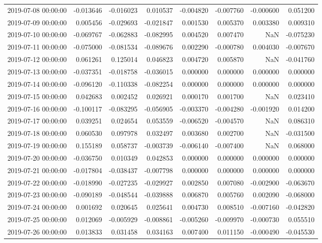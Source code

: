\begin{tabular}{lrrrrrrr}
2019-07-08 00:00:00 & -0.013646 & -0.016023 & 0.010537 & -0.004820 & -0.007760 & -0.000600 & 0.051200 \\
2019-07-09 00:00:00 & 0.005456 & -0.029693 & -0.021847 & 0.001530 & 0.005370 & 0.003380 & 0.009310 \\
2019-07-10 00:00:00 & -0.069767 & -0.062883 & -0.082995 & 0.004520 & 0.007470 & NaN & -0.075230 \\
2019-07-11 00:00:00 & -0.075000 & -0.081534 & -0.089676 & 0.002290 & -0.000780 & 0.004030 & -0.007670 \\
2019-07-12 00:00:00 & 0.061261 & 0.125014 & 0.046823 & 0.004720 & 0.005870 & NaN & -0.041760 \\
2019-07-13 00:00:00 & -0.037351 & -0.018758 & -0.036015 & 0.000000 & 0.000000 & 0.000000 & 0.000000 \\
2019-07-14 00:00:00 & -0.096120 & -0.110338 & -0.082254 & 0.000000 & 0.000000 & 0.000000 & 0.000000 \\
2019-07-15 00:00:00 & 0.042683 & 0.002452 & 0.026921 & 0.000170 & 0.001700 & NaN & 0.023410 \\
2019-07-16 00:00:00 & -0.100117 & -0.083295 & -0.056905 & -0.003370 & -0.004280 & -0.001920 & 0.014200 \\
2019-07-17 00:00:00 & 0.039251 & 0.024654 & 0.053559 & -0.006520 & -0.004570 & NaN & 0.086310 \\
2019-07-18 00:00:00 & 0.060530 & 0.097978 & 0.032497 & 0.003680 & 0.002700 & NaN & -0.031500 \\
2019-07-19 00:00:00 & 0.155189 & 0.058737 & -0.003739 & -0.006140 & -0.007400 & NaN & 0.068000 \\
2019-07-20 00:00:00 & -0.036750 & 0.010349 & 0.042853 & 0.000000 & 0.000000 & 0.000000 & 0.000000 \\
2019-07-21 00:00:00 & -0.017804 & -0.038437 & -0.007798 & 0.000000 & 0.000000 & 0.000000 & 0.000000 \\
2019-07-22 00:00:00 & -0.018990 & -0.027235 & -0.029927 & 0.002850 & 0.007080 & -0.002900 & -0.063670 \\
2019-07-23 00:00:00 & -0.090189 & -0.048544 & -0.039888 & 0.006870 & 0.005760 & 0.002090 & -0.068000 \\
2019-07-24 00:00:00 & 0.001692 & 0.020645 & 0.025641 & 0.004730 & 0.008510 & -0.007160 & -0.042820 \\
2019-07-25 00:00:00 & 0.012069 & -0.005929 & -0.008861 & -0.005260 & -0.009970 & -0.000730 & 0.055510 \\
2019-07-26 00:00:00 & 0.013833 & 0.031458 & 0.034163 & 0.007400 & 0.011150 & -0.000490 & -0.045530 \\

\end{tabular}
